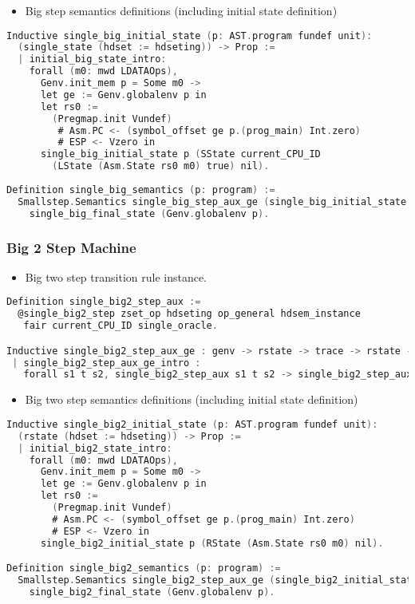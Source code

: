 \begin{itemize}[leftmargin=*]
\item Big step semantics definitions (including initial state definition)
\end{itemize}
\begin{lstlisting}[language=C]
Inductive single_big_initial_state (p: AST.program fundef unit): 
  (single_state (hdset := hdseting)) -> Prop :=
  | initial_big_state_intro: 
    forall (m0: mwd LDATAOps),
      Genv.init_mem p = Some m0 ->
      let ge := Genv.globalenv p in
      let rs0 :=
        (Pregmap.init Vundef)
         # Asm.PC <- (symbol_offset ge p.(prog_main) Int.zero)
         # ESP <- Vzero in
      single_big_initial_state p (SState current_CPU_ID 
        (LState (Asm.State rs0 m0) true) nil).
      
Definition single_big_semantics (p: program) :=
  Smallstep.Semantics single_big_step_aux_ge (single_big_initial_state p) 
    single_big_final_state (Genv.globalenv p).
\end{lstlisting}

\subsubsection{Big 2 Step Machine}
\begin{itemize}[leftmargin=*]
\item Big two step transition rule instance.
\end{itemize}
\begin{lstlisting}[language=C]
Definition single_big2_step_aux :=
  @single_big2_step zset_op hdseting op_general hdsem_instance 
   fair current_CPU_ID single_oracle.

Inductive single_big2_step_aux_ge : genv -> rstate -> trace -> rstate -> Prop :=
 | single_big2_step_aux_ge_intro : 
   forall s1 t s2, single_big2_step_aux s1 t s2 -> single_big2_step_aux_ge ge s1 t s2.
\end{lstlisting}


\begin{itemize}[leftmargin=*]
\item Big two step semantics definitions (including initial state definition)
\end{itemize}
\begin{lstlisting}[language=C]
Inductive single_big2_initial_state (p: AST.program fundef unit): 
  (rstate (hdset := hdseting)) -> Prop :=
  | initial_big2_state_intro: 
    forall (m0: mwd LDATAOps),
      Genv.init_mem p = Some m0 ->
      let ge := Genv.globalenv p in
      let rs0 :=
        (Pregmap.init Vundef)
        # Asm.PC <- (symbol_offset ge p.(prog_main) Int.zero)
        # ESP <- Vzero in
      single_big2_initial_state p (RState (Asm.State rs0 m0) nil).

Definition single_big2_semantics (p: program) :=
  Smallstep.Semantics single_big2_step_aux_ge (single_big2_initial_state p) 
    single_big2_final_state (Genv.globalenv p).
\end{lstlisting}

